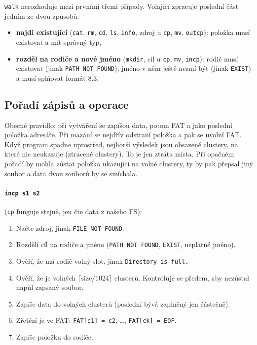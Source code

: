 \documentclass[10pt, a4paper]{report}
\newcommand{\code}[1]{\texttt{#1}}
\begin{document}
	\code{walk} nerozhoduje mezi prvními třemi případy. Volající zpracuje poslední část jedním ze
	dvou způsobů:
	\begin{itemize}
		\item \textbf{najdi existující} (\code{cat}, \code{rm}, \code{cd}, \code{ls}, \code{info},
		zdroj u \code{cp}, \code{mv}, \code{outcp}): položka musí existovat a mít správný typ,
		\item \textbf{rozděl na rodiče a nové jméno} (\code{mkdir}, cíl u \code{cp}, \code{mv},
		\code{incp}): rodič musí existovat (jinak \code{PATH NOT FOUND}), jméno v něm ještě nesmí
		být (jinak \code{EXIST}) a musí splňovat formát 8.3.
	\end{itemize}
	
	\subsection{Pořadí zápisů a operace}
	
	Obecné pravidlo: při vytváření se zapíšou data, potom FAT a jako poslední položka adresáře. Při
	mazání se nejdřív odstraní položka a pak se uvolní FAT. Když program spadne uprostřed, nejhorší
	výsledek jsou obsazené clustery, na které nic neukazuje (ztracené clustery). To je jen ztráta
	místa. Při opačném pořadí by mohla zůstat položka ukazující na volné clustery, ty by pak přepsal
	jiný soubor a data dvou souborů by se smíchala.
	
	\paragraph{\code{incp s1 s2}} (\code{cp} funguje stejně, jen čte data z našeho FS):
	\begin{enumerate}
		\item Načte zdroj, jinak \code{FILE NOT FOUND}.
		\item Rozdělí cíl na rodiče a jméno (\code{PATH NOT FOUND}, \code{EXIST}, neplatné jméno).
		\item Ověří, že má rodič volný slot, jinak \code{Directory is full.}
		\item Ověří, že je volných $\lceil \text{size} / 1024 \rceil$ clusterů. Kontroluje se
		předem, aby nezůstal napůl zapsaný soubor.
		\item Zapíše data do volných clusterů (poslední bývá zaplněný jen částečně).
		\item Zřetězí je ve FAT: \code{FAT[c1] = c2}, \dots, \code{FAT[ck] = EOF}.
		\item Zapíše položku do rodiče.
	\end{enumerate}
	
\end{document}
